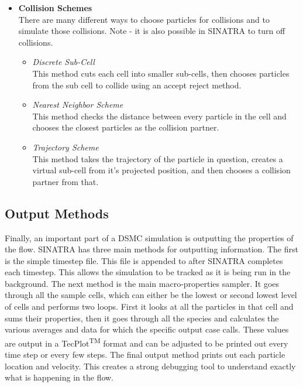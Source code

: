 \begin{itemize}
    
    \item \textbf{Collision Schemes} \\
    There are many different ways to choose particles for collisions and to simulate those collisions. Note - it is also possible in SINATRA to turn off collisions.
    \begin{itemize}
        \item \textit{Discrete Sub-Cell}\\
        This method cuts each cell into smaller sub-cells, then chooses particles from the sub cell to collide using an accept reject method. 
        \item \textit{Nearest Neighbor Scheme}\\
        This method checks the distance between every particle in the cell and chooses the closest particles as the collision partner.
        \item \textit{Trajectory Scheme}\\
        This method takes the trajectory of the particle in question, creates a virtual sub-cell from it's projected position, and then chooses a collision partner from that. 
    \end{itemize}
\end{itemize}


\subsection{Output Methods}
\label{sec:output}

Finally, an important part of a DSMC simulation is outputting the properties of the flow. SINATRA has three main methods for outputting information. The first is the simple timestep file. This file is appended to after SINATRA completes each timestep. This allows the simulation to be tracked as it is being run in the background. The next method is the main macro-properties sampler. It goes through all the sample cells, which can either be the lowest or second lowest level of cells and performs two loops. First it looks at all the particles in that cell and sums their properties, then it goes through all the species and calculates the various averages and data for which the specific output case calls. These values are output in a TecPlot\textsuperscript{TM} format and can be adjusted to be printed out every time step or every few steps. The final output method prints out each particle location and velocity. This creates a strong debugging tool to understand exactly what is happening in the flow. 